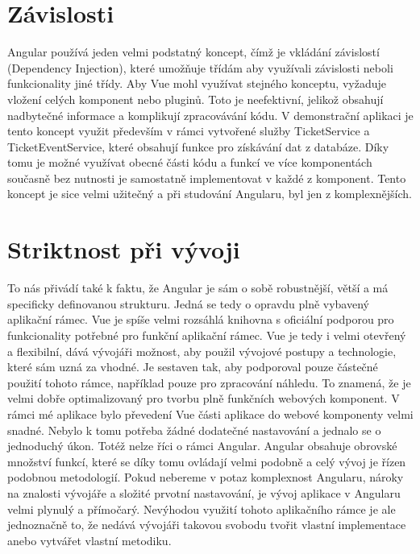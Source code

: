     \section{Závislosti}
Angular používá jeden velmi podstatný koncept, čímž je vkládání závislostí (Dependency Injection), které umožňuje třídám aby využívali závislosti neboli funkcionality jiné třídy. Aby Vue mohl využívat stejného konceptu, vyžaduje vložení celých komponent nebo pluginů. Toto je neefektivní, jelikož obsahují nadbytečné informace a komplikují zpracovávání kódu. 
V demonstrační aplikaci je tento koncept využit především v rámci vytvořené služby TicketService a TicketEventService, které obsahují funkce pro získávání dat z databáze. Díky tomu je možné využívat obecné části kódu a funkcí ve více komponentách současně bez nutnosti je samostatně implementovat v každé z komponent. Tento koncept je sice velmi užitečný a při studování Angularu, byl jen z komplexnějších.

    \section{Striktnost při vývoji}
To nás přivádí také k faktu, že Angular je sám o sobě robustnější, větší a má specificky definovanou strukturu. Jedná se tedy o opravdu plně vybavený aplikační rámec. Vue je spíše velmi rozsáhlá knihovna s oficiální podporou pro funkcionality potřebné pro funkční aplikační rámec. 
Vue je tedy i velmi otevřený a flexibilní, dává vývojáři možnost, aby použil vývojové postupy a technologie, které sám uzná za vhodné. Je sestaven tak, aby podporoval pouze částečné použití tohoto rámce, například pouze pro zpracování náhledu. To znamená, že je velmi dobře optimalizovaný pro tvorbu plně funkčních webových komponent. V rámci mé aplikace bylo převedení Vue části aplikace do webové komponenty velmi snadné. Nebylo k tomu potřeba žádné dodatečné nastavování a jednalo se o jednoduchý úkon.
Totéž nelze říci o rámci Angular. Angular obsahuje obrovské množství funkcí, které se díky tomu ovládají velmi podobně a celý vývoj je řízen podobnou metodologií. Pokud nebereme v potaz komplexnost Angularu, nároky na znalosti vývojáře a složité prvotní nastavování, je vývoj aplikace v Angularu velmi plynulý a přímočarý. Nevýhodou využití tohoto aplikačního rámce je ale jednoznačně to, že nedává vývojáři takovou svobodu tvořit vlastní implementace anebo vytvářet vlastní metodiku.

